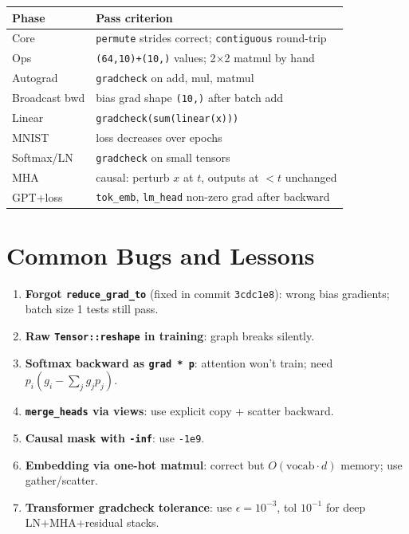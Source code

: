 \documentclass[11pt,a4paper]{article}
\begin{document}
\begin{center}
\small
\begin{longtable}{@{}p{3cm}p{10cm}@{}}
  \toprule
  Phase & Pass criterion \\
  \midrule
  \endhead
  Core & \texttt{permute} strides correct; \texttt{contiguous} round-trip \\
  Ops & \texttt{(64,10)+(10,)} values; 2$\times$2 matmul by hand \\
  Autograd & \texttt{gradcheck} on add, mul, matmul \\
  Broadcast bwd & bias grad shape \texttt{(10,)} after batch add \\
  Linear & \texttt{gradcheck(sum(linear(x)))} \\
  MNIST & loss decreases over epochs \\
  Softmax/LN & \texttt{gradcheck} on small tensors \\
  MHA & causal: perturb $x$ at $t$, outputs at $<t$ unchanged \\
  GPT+loss & \texttt{tok\_emb}, \texttt{lm\_head} non-zero grad after backward \\
  \bottomrule
\end{longtable}
\end{center}

\section{Common Bugs and Lessons}
\label{sec:bugs}

\begin{enumerate}[leftmargin=*]
  \item \textbf{Forgot \texttt{reduce\_grad\_to}} (fixed in commit \texttt{3cdc1e8}):
        wrong bias gradients; batch size 1 tests still pass.
  \item \textbf{Raw \texttt{Tensor::reshape} in training}: graph breaks silently.
  \item \textbf{Softmax backward as \texttt{grad * p}}: attention won't train; need
        $p_i(g_i - \sum_j g_j p_j)$.
  \item \textbf{\texttt{merge\_heads} via views}: use explicit copy + scatter backward.
  \item \textbf{Causal mask with \texttt{-inf}}: use \texttt{-1e9}.
  \item \textbf{Embedding via one-hot matmul}: correct but $O(\mathrm{vocab}\cdot d)$ memory;
        use gather/scatter.
  \item \textbf{Transformer gradcheck tolerance}: use $\epsilon=10^{-3}$, tol $10^{-1}$ for
        deep LN+MHA+residual stacks.
\end{enumerate}
\end{document}
